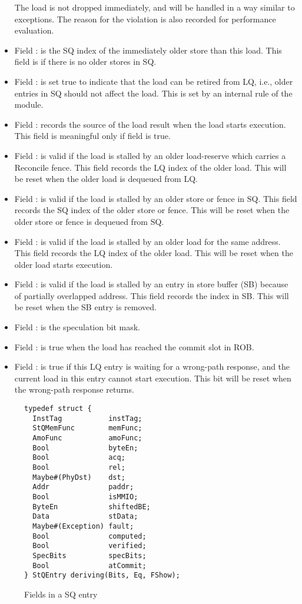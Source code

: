 \begin{itemize}
    The load is not dropped immediately, and will be handled in a way similar to exceptions.
    The reason for the violation is also recorded for performance evaluation.
    \item Field : is the SQ index of the immediately older store than this load.
    This field is  if there is no older stores in SQ.
    \item Field : is set true to indicate that the load can be retired from LQ, i.e., older entries in SQ should not affect the load.
    This is set by an internal rule of the module.
    \item Field : records the source of the load result when the load starts execution.
    This field is meaningful only if field  is true.
    \item Field : is valid if the load is stalled by an older load-reserve which carries a Reconcile fence.
    This field records the LQ index of the older load.
    This will be reset when the older load is dequeued from LQ.
    \item Field : is valid if the load is stalled by an older store or fence in SQ.
    This field records the SQ index of the older store or fence.
    This will be reset when the older store or fence is dequeued from SQ.
    \item Field : is valid if the load is stalled by an older load for the same address.
    This field records the LQ index of the older load.
    This will be reset when the older load starts execution.
    \item Field : is valid if the load is stalled by an entry in store buffer (SB) because of partially overlapped address.
    This field records the index in SB.
    This will be reset when the SB entry is removed.
    \item Field : is the speculation bit mask.
    \item Field : is true when the load has reached the commit slot in ROB.
    \item Field : is true if this LQ entry is waiting for a wrong-path response, and the current load in this entry cannot start execution.
    This bit will be reset when the wrong-path response returns.
\end{itemize}

\begin{figure}
\begin{lstlisting}[caption={}]
typedef struct {
  InstTag           instTag;
  StQMemFunc        memFunc;
  AmoFunc           amoFunc;
  Bool              byteEn;
  Bool              acq;
  Bool              rel;
  Maybe#(PhyDst)    dst;
  Addr              paddr;
  Bool              isMMIO;
  ByteEn            shiftedBE;
  Data              stData;
  Maybe#(Exception) fault;
  Bool              computed;
  Bool              verified;
  SpecBits          specBits;
  Bool              atCommit;
} StQEntry deriving(Bits, Eq, FShow);
\end{lstlisting}
\caption{Fields in a SQ entry}\label{fig:sq-entry}
\end{figure}

